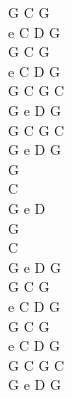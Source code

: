 \documentclass[a5paper, 10pt]{book}
\begin{document}
\begin{minipage}[t]{0.2\textwidth}
G C G \\
e C D G\\
G C G \\
e C D G\\
G C G C\\
G e D G\\
G C G C\\
G e D G\\

G\\
C\\
G e D\\
G\\
C\\
G e D G\\

G C G \\
e C D G\\
G C G \\
e C D G\\
G C G C\\
G e D G\\
\end{minipage}

\newpage
\end{document}

